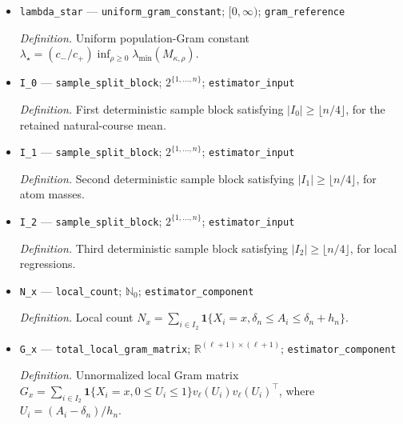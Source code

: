 \documentclass{article}
\begin{document}
\begin{itemize}
  \par\smallskip\noindent\emph{Definition.} Normalized reference moment matrix \(M_{\kappa,\rho}=\{\int_0^1v_\ell(u)v_\ell(u)^\top(\rho+u)^\kappa\,\mathrm du\}/\{\int_0^1(\rho+u)^\kappa\,\mathrm du\}\) for \(\rho\in[0,\infty)\).
  \item \texttt{lambda\_\allowbreak{}star} --- \texttt{uniform\_\allowbreak{}gram\_\allowbreak{}constant}; \([0,\infty)\); \texttt{gram\_\allowbreak{}reference}
  \par\smallskip\noindent\emph{Definition.} Uniform population-Gram constant \(\lambda_\star=(c_-/c_+)\inf_{\rho\geq0}\lambda_{\min}(M_{\kappa,\rho})\).
  \item \texttt{I\_\allowbreak{}0} --- \texttt{sample\_\allowbreak{}split\_\allowbreak{}block}; \(2^{\{1,\ldots,n\}}\); \texttt{estimator\_\allowbreak{}input}
  \par\smallskip\noindent\emph{Definition.} First deterministic sample block satisfying \(|I_0|\geq\lfloor n/4\rfloor\), for the retained natural-course mean.
  \item \texttt{I\_\allowbreak{}1} --- \texttt{sample\_\allowbreak{}split\_\allowbreak{}block}; \(2^{\{1,\ldots,n\}}\); \texttt{estimator\_\allowbreak{}input}
  \par\smallskip\noindent\emph{Definition.} Second deterministic sample block satisfying \(|I_1|\geq\lfloor n/4\rfloor\), for atom masses.
  \item \texttt{I\_\allowbreak{}2} --- \texttt{sample\_\allowbreak{}split\_\allowbreak{}block}; \(2^{\{1,\ldots,n\}}\); \texttt{estimator\_\allowbreak{}input}
  \par\smallskip\noindent\emph{Definition.} Third deterministic sample block satisfying \(|I_2|\geq\lfloor n/4\rfloor\), for local regressions.
  \item \texttt{N\_\allowbreak{}x} --- \texttt{local\_\allowbreak{}count}; \(\mathbb N_0\); \texttt{estimator\_\allowbreak{}component}
  \par\smallskip\noindent\emph{Definition.} Local count \(N_x=\sum_{i\in I_2}\mathbf 1\{X_i=x,\delta_n\leq A_i\leq\delta_n+h_n\}\).
  \item \texttt{G\_\allowbreak{}x} --- \texttt{total\_\allowbreak{}local\_\allowbreak{}gram\_\allowbreak{}matrix}; \(\mathbb R^{(\ell+1)\times(\ell+1)}\); \texttt{estimator\_\allowbreak{}component}
  \par\smallskip\noindent\emph{Definition.} Unnormalized local Gram matrix \(G_x=\sum_{i\in I_2}\mathbf 1\{X_i=x,0\leq U_i\leq1\}v_\ell(U_i)v_\ell(U_i)^\top\), where \(U_i=(A_i-\delta_n)/h_n\).

\end{itemize}
\end{document}
